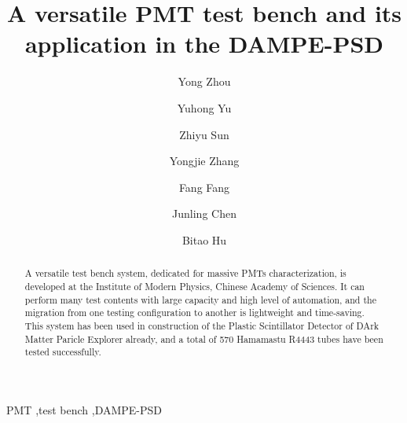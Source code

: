 \documentclass[5p, times]{elsarticle}
\begin{document}
\begin{frontmatter}

\title{A versatile PMT test bench and its application in the DAMPE-PSD}

\author[imp,lzu,ucas]{Yong Zhou}

\author[imp]{Yuhong Yu}

\author[imp]{Zhiyu Sun}

\author[imp]{Yongjie Zhang}
\author[imp]{Fang Fang}
\author[imp]{Junling Chen}

\author[lzu]{Bitao Hu}

\address[imp]{Institute of Modern Physicas, Chinese Academy of Sciences,  509 Nanchang Road,  Lanzhou,  730000,  P.R.China}
\address[lzu]{School of Nuclear Science and Technology,  Lanzhou University,  222 South Tianshui Road,  Lanzhou,  730000,  P.R.China}
\address[ucas]{Graduate University of the Chinese Academy of Sciences,  19A Yuquan Road,  Beijing,  100049,  P.R.China}

\begin{abstract}

A versatile test bench system, dedicated for massive PMTs characterization, is developed at the Institute of Modern Physics, Chinese Academy of Sciences. 
It can perform many test contents with large capacity and high level of automation, and the migration from one testing configuration to another is lightweight and time-saving. 
This system has been used in construction of the Plastic Scintillator Detector of DArk Matter Paricle Explorer already, and a total of 570 Hamamastu R4443 tubes have been tested successfully.
\end{abstract}

\begin{keyword}
PMT
\sep test bench
\sep DAMPE-PSD



\end{keyword}

\end{frontmatter}
\linenumbers
\end{document}
